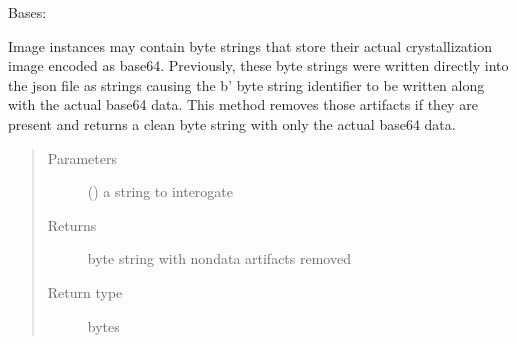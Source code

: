 \documentclass[letterpaper,10pt,english]{sphinxmanual}
\begin{document}

\begin{fulllineitems}
\label{\detokenize{polo.utils:polo.utils.io_utils.RunDeserializer}}
Bases: 

\begin{fulllineitems}
\label{\detokenize{polo.utils:polo.utils.io_utils.RunDeserializer.clean_base64_string}}
Image instances may contain byte strings that store their actual
crystallization image encoded as base64. Previously, these byte strings
were written directly into the json file as strings causing the b’
byte string identifier to be written along with the actual base64 data.
This method removes those artifacts if they are present and returns a
clean byte string with only the actual base64 data.
\begin{quote}\begin{description}
\item[{Parameters}] \leavevmode
{} () \textendash{} a string to interogate

\item[{Returns}] \leavevmode
byte string with non\sphinxhyphen{}data artifacts removed

\item[{Return type}] \leavevmode
bytes

\end{description}\end{quote}

\end{fulllineitems}



\end{fulllineitems}
\end{document}
